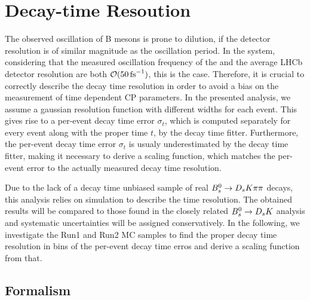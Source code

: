 
\clearpage
\section{Decay-time Resoution}
\label{sec:Resolution}

The observed oscillation of B mesons is prone to dilution, if the detector resolution is of similar magnitude as the oscillation period. 
In the \Bs system, considering that the measured oscillation frequency of the \Bs \cite{PDG2014} and the average LHCb detector resolution \cite{LHCb-DP-2014-002} are both $\mathcal{O}(50 \mathrm{ \,fs}^{-1})$, this is the case.
Therefore, it is crucial to correctly describe the decay time resolution in order to avoid a bias on the measurement of time dependent CP parameters. \newline
In the presented analysis, we assume a gaussian resolution function with different widths for each event. 
This gives rise to a per-event decay time error $\sigma_{t}$, which is computed separately for every event along with the proper time $t$, by the decay time fitter. 
Furthermore, the per-event decay time error $\sigma_{t}$ is usualy underestimated by the decay time fitter, 
making it necessary to derive a scaling function, which matches the per-event error to the actually measured decay time resolution. \newline

Due to the lack of a decay time unbiased sample of real ${{B}^0_{s}}\rightarrow{\ensuremath{{D}_{s}}}{\ensuremath{K}}{\ensuremath{\pi}}{\ensuremath{\pi}}$ decays, this analysis relies on simulation to describe the time resolution. 
The obtained results will be compared to those found in the closely related ${{B}^0_{s}}\rightarrow{\ensuremath{{D}_{s}}}{\ensuremath{K}}$ analysis and systematic uncertainties will be assigned conservatively.
In the following, we investigate the Run1 and Run2 MC samples to find the proper decay time resolution in bins of the per-event decay time erros and derive a scaling function from that.      

\subsection{Formalism} 

